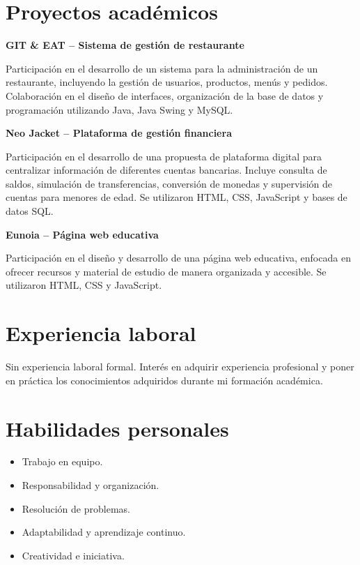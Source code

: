 \documentclass[11pt,a4paper]{article}
\begin{document}
\section*{Proyectos académicos}

\textbf{\textcolor{rosaoscuro}{
GIT \& EAT -- Sistema de gestión de restaurante}}

Participación en el desarrollo de un sistema para la
administración de un restaurante, incluyendo la gestión
de usuarios, productos, menús y pedidos. Colaboración
en el diseño de interfaces, organización de la base de
datos y programación utilizando Java, Java Swing y MySQL.

\vspace{5pt}

\textbf{\textcolor{rosaoscuro}{
Neo Jacket -- Plataforma de gestión financiera}}

Participación en el desarrollo de una propuesta de
plataforma digital para centralizar información de
diferentes cuentas bancarias. Incluye consulta de saldos,
simulación de transferencias, conversión de monedas
y supervisión de cuentas para menores de edad.
Se utilizaron HTML, CSS, JavaScript y bases de datos SQL.

\vspace{5pt}

\textbf{\textcolor{rosaoscuro}{
Eunoia -- Página web educativa}}

Participación en el diseño y desarrollo de una página
web educativa, enfocada en ofrecer recursos y material
de estudio de manera organizada y accesible.
Se utilizaron HTML, CSS y JavaScript.

\section*{Experiencia laboral}

Sin experiencia laboral formal. Interés en adquirir
experiencia profesional y poner en práctica los
conocimientos adquiridos durante mi formación académica.

\section*{Habilidades personales}

\begin{itemize}
    \item Trabajo en equipo.
    \item Responsabilidad y organización.
    \item Resolución de problemas.
    \item Adaptabilidad y aprendizaje continuo.
    \item Creatividad e iniciativa.
\end{itemize}
\end{document}
